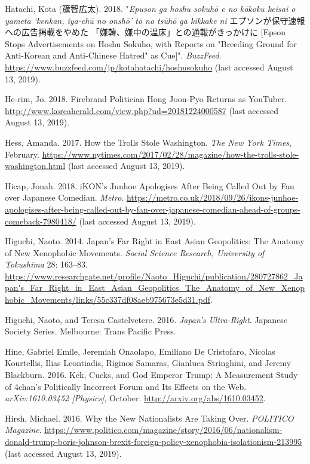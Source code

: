 \documentclass[10pt,british,A4paper,twoside]{memoir}
\begin{document}
\hypertarget{ref-hatachi__2018}{}
Hatachi, Kota (籏智広太). 2018. "\emph{Epuson ga hoshu sokuhō e no kōkoku keisai o yameta `kenkan, iya-chū no onshō' to no tsūhō ga kikkake ni} エプソンが保守速報への広告掲載をやめた 「嫌韓、嫌中の温床」との通報がきっかけに [Epson Stops Advertisements on Hoshu Sokuho, with Reports on "Breeding Ground for Anti-Korean and Anti-Chinese Hatred" as Cue]". \emph{BuzzFeed}.
\url{https://www.buzzfeed.com/jp/kotahatachi/hoshusokuho} (last accessed August 13, 2019).

\hypertarget{ref-he-rim_firebrand_2018}{}
He-rim, Jo. 2018. Firebrand Politician Hong Joon-Pyo Returns as
YouTuber. \url{http://www.koreaherald.com/view.php?ud=20181224000587} (last accessed August 13, 2019).

\hypertarget{ref-hess_how_2017}{}
Hess, Amanda. 2017. How the Trolls Stole Washington. \emph{The New York
Times}, February.
\url{https://www.nytimes.com/2017/02/28/magazine/how-the-trolls-stole-washington.html} (last accessed August 13, 2019).

\hypertarget{ref-hicap_ikons_2018}{}
Hicap, Jonah. 2018. iKON's Junhoe Apologises After Being Called Out by
Fan over Japanese Comedian. \emph{Metro}.
\url{https://metro.co.uk/2018/09/26/ikons-junhoe-apologises-after-being-called-out-by-fan-over-japanese-comedian-ahead-of-groups-comeback-7980418/} (last accessed August 13, 2019).

\hypertarget{ref-higuchi_japans_2014}{}
Higuchi, Naoto. 2014. Japan's Far Right in East Asian Geopolitics: The
Anatomy of New Xenophobic Movements. \emph{Social Science Research,
University of Tokushima} 28: 163--83.
\url{https://www.researchgate.net/profile/Naoto_Higuchi/publication/280727862_Japan's_Far_Right_in_East_Asian_Geopolitics_The_Anatomy_of_New_Xenophobic_Movements/links/55c337df08aeb975673e5d31.pdf}.

\hypertarget{ref-higuchi_japans_2016}{}
Higuchi, Naoto, and Teresa Castelvetere. 2016. \emph{Japan's
Ultra-Right}. Japanese Society Series. Melbourne: Trans Pacific Press.

\hypertarget{ref-hine_kek_2016}{}
Hine, Gabriel Emile, Jeremiah Onaolapo, Emiliano De Cristofaro, Nicolas
Kourtellis, Ilias Leontiadis, Riginos Samaras, Gianluca Stringhini, and
Jeremy Blackburn. 2016. Kek, Cucks, and God Emperor Trump: A Measurement
Study of 4chan's Politically Incorrect Forum and Its Effects on the Web.
\emph{arXiv:1610.03452 {[}Physics{]}}, October.
\url{http://arxiv.org/abs/1610.03452}.

\hypertarget{ref-hirsh_why_2016}{}
Hirsh, Michael. 2016. Why the New Nationalists Are Taking Over.
\emph{POLITICO Magazine}.
\url{https://www.politico.com/magazine/story/2016/06/nationalism-donald-trump-boris-johnson-brexit-foreign-policy-xenophobia-isolationism-213995} (last accessed August 13, 2019).
\end{document}
